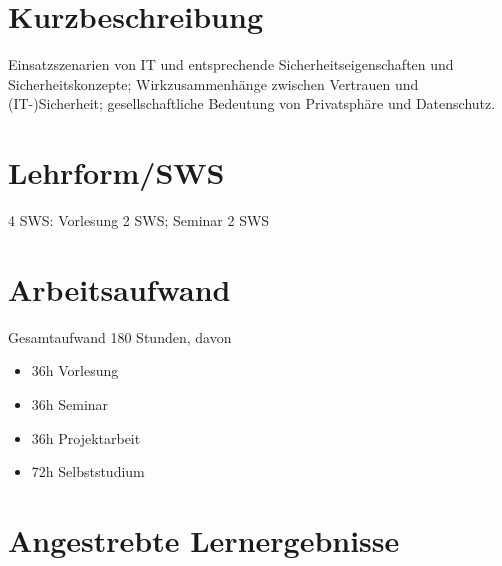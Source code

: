\section*{Kurzbeschreibung\label{/mi-2017/modulbeschreibungen-master/MA_WTW_Modul_IT-Sicherheit}}\label{kurzbeschreibungpathlabelmi-2017modulbeschreibungen-mastermaux5fwtwux5fmodulux5fit-sicherheit}

Einsatzszenarien von IT und entsprechende Sicherheitseigenschaften und
Sicherheitskonzepte; Wirkzusammenhänge zwischen Vertrauen und
(IT-)Sicherheit; gesellschaftliche Bedeutung von Privatsphäre und
Datenschutz.

\section*{Lehrform/SWS
\label{/mi-2017/modulbeschreibungen-master/MA_WTW_Modul_IT-Sicherheit}}\label{lehrformsws-pathlabelmi-2017modulbeschreibungen-mastermaux5fwtwux5fmodulux5fit-sicherheit}

4 SWS: Vorlesung 2 SWS; Seminar 2 SWS

\section*{Arbeitsaufwand
\label{/mi-2017/modulbeschreibungen-master/MA_WTW_Modul_IT-Sicherheit}}\label{arbeitsaufwand-pathlabelmi-2017modulbeschreibungen-mastermaux5fwtwux5fmodulux5fit-sicherheit}

Gesamtaufwand 180 Stunden, davon

\begin{itemize}
\tightlist
\item
  36h Vorlesung
\item
  36h Seminar
\item
  36h Projektarbeit\\
\item
  72h Selbststudium
\end{itemize}

\section*{Angestrebte
Lernergebnisse\label{/mi-2017/modulbeschreibungen-master/MA_WTW_Modul_IT-Sicherheit}}\label{angestrebte-lernergebnissepathlabelmi-2017modulbeschreibungen-mastermaux5fwtwux5fmodulux5fit-sicherheit}

